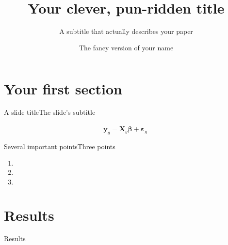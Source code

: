 \documentclass[english,10pt,aspectratio=1610]{beamer}
\title{Your clever, pun-ridden title}
\subtitle{A subtitle that actually describes your paper}
\author{The fancy version of your name}
\date{}
\begin{document}
\maketitle

\section{Your first section}

\begin{frame}{A slide title}{The slide's subtitle}
  \lipsumsentence[1-2] \\ \vspace{2em}
  \pause
  \lipsumsentence[3] \\ \vspace{2em}
  \pause
  \lipsumsentence[4]
  \[ \mathbf{y}_g = \mathbf{X}_g \boldsymbol{\beta} + \boldsymbol{\varepsilon}_g \ \]
\end{frame}

\begin{frame}{Several important points}{Three points}
\textbf{\lipsumsentence[5]}
  \begin{enumerate}
    \item \lipsumsentence[6]
    \item \lipsumsentence[7]
    \item \lipsumsentence[8]
  \end{enumerate}
\end{frame}

\section{Results}

\begin{frame}
\textcolor{my-dark-grey}{\large Results}
\end{frame}
\end{document}
